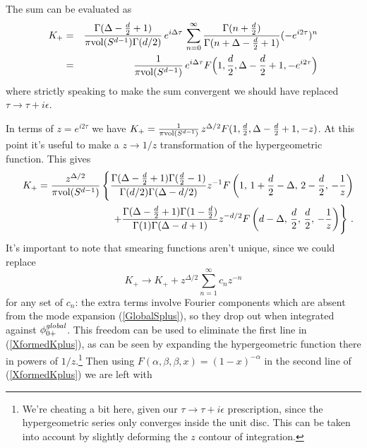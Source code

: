 \documentclass[12pt]{article}
\newcommand{\phinotg} [1]{{\phi_{0#1}^{\it global}}}
\begin{document}
The sum can be evaluated as
\begin{eqnarray}
\nonumber
K_+ & = & {\Gamma(\Delta - {d \over 2} + 1) \over \pi {\rm vol}(S^{d-1}) \Gamma(d/2)} \, e^{i \Delta \tau} \,
\sum_{n = 0}^\infty {\Gamma(n + {d \over 2}) \over \Gamma(n + \Delta - {d \over 2} + 1)} (-e^{i 2 \tau})^n \\
\label{CenterModeSum}
& = & {1 \over \pi {\rm vol}(S^{d-1})} \, e^{i \Delta \tau} F\Bigl(1, {d \over 2},\Delta - {d \over 2} + 1,-e^{i 2 \tau}\Bigr)
\end{eqnarray}
where strictly speaking to make the sum convergent we should have replaced $\tau \rightarrow \tau + i \epsilon$.

In terms of $z = e^{i 2 \tau}$ we have $K_+ = {1 \over \pi {\rm vol}(S^{d-1})} \, z^{\Delta / 2}
F(1, {d \over 2},\Delta - {d \over 2} + 1,-z)$.  At this point it's useful to make a $z \rightarrow 1/z$
transformation of the hypergeometric function.  This gives
\begin{eqnarray}
\nonumber
&& K_+ = {z^{\Delta/2} \over \pi {\rm vol}(S^{d-1})} \, \Biggl\lbrace
{\Gamma(\Delta - {d \over 2} + 1) \Gamma({d \over 2} - 1) \over \Gamma(d/2) \Gamma(\Delta - d/2)}
z^{-1} F\left(1,\,1+{d \over 2} - \Delta,\, 2 - {d \over 2},\, -{1 \over z}\right) \\
\label{XformedKplus}
& & \qquad\qquad +
{\Gamma(\Delta - {d \over 2} + 1) \Gamma(1 - {d \over 2}) \over \Gamma(1) \Gamma(\Delta - d + 1)}
z^{-d/2} F\left(d - \Delta,\, {d \over 2},\, {d \over 2},\, - {1 \over z}\right)
\Biggr\rbrace~.
\end{eqnarray}
It's important to note that smearing functions aren't unique, since we could replace
\begin{equation}
K_+ \rightarrow K_+ + z^{\Delta/2} \sum_{n = 1}^\infty c_n z^{-n}
\end{equation}
for any set of $c_n$: the extra terms involve Fourier components which
are absent from the mode expansion (\ref{GlobalSplus}), so they drop
out when integrated against $\phinotg{+}$.  This freedom can be used
to eliminate the first line in (\ref{XformedKplus}), as can be seen by
expanding the hypergeometric function there in powers of
$1/z$.\footnote{We're cheating a bit here, given our $\tau \rightarrow
\tau + i \epsilon$ prescription, since the hypergeometric series
only converges inside the unit disc.  This can be taken into account
by slightly deforming the $z$ contour of integration.}  Then using
$F(\alpha,\beta,\beta,x) = (1 - x)^{-\alpha}$ in the second line of
(\ref{XformedKplus}) we are left with
\end{document}
